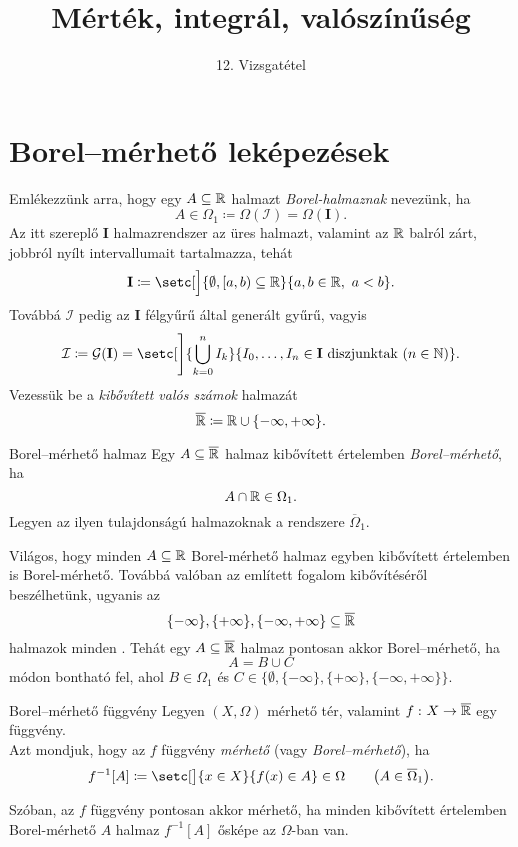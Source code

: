 \documentclass[
]{elteikthesis}[2024/04/26]
\title{Mérték, integrál, valószínűség} %
\subtitle{12. Vizsgatétel}
\begin{document}
	
	
	\section{Borel--mérhető leképezések}
	
	Emlékezzünk arra, hogy egy \( A \subseteq \mathbb{R} \) halmazt \emph{Borel-halmaznak} nevezünk, ha
	\[
		A \in \Omega_1 \coloneq \Omega( \mathcal{I} ) = \Omega( \mathbf{I} ).
	\]
	Az itt szereplő \( \mathbf{I} \) halmazrendszer az üres halmazt, 
	valamint az \( \mathbb{R} \) balról zárt, jobbról nyílt intervallumait tartalmazza, tehát
	\[
		\mathbf{I} \coloneq 
		\setc[\Big]{ \emptyset, [a, b) \subseteq \R }{ a, b \in \R, \ a < b }.
	\]
	Továbbá \( \mathcal{I} \) pedig az \( \mathbf{I} \) félgyűrű által generált gyűrű, vagyis
	\[
		\mathcal{I} \coloneq
		\mathcal{G}( \mathbf{I} ) = 
		\setc[\Bigg]{ \bigcup_{k=0}^{n} I_k }
		            { I_0, \dots, I_n \in \mathbf{I} \text{ diszjunktak } (n \in \N) }.
	\]
	Vezessük be a \emph{kibővített valós számok} halmazát
	\[
		\overline{ \mathbb{R} } \coloneq \mathbb{R} \cup \{ -\infty, +\infty \}.
	\]
	\begin{definition}{Borel--mérhető halmaz}{}
		Egy \( A \subseteq \overline{\mathbb{R}} \) halmaz 
		kibővített értelemben \emph{Borel--mérhető}, ha
		\[
			A \cap \mathbb{R} \in \Omega_1.
		\]
		Legyen az ilyen tulajdonságú halmazoknak a rendszere \( \overline{\Omega}_1 \).
	\end{definition}
	
	\begin{note}
		Világos, hogy minden \( A \subseteq \mathbb{R} \) Borel-mérhető halmaz egyben kibővített 
		értelemben is Borel-mérhető. Továbbá valóban az említett fogalom kibővítéséről beszélhetünk, ugyanis az
		\[
			\{ -\infty \}, \{ +\infty \}, \{ -\infty, +\infty \} \subseteq \overline{ \mathbb{R} }
		\]
		halmazok minden .
		Tehát egy \( A \subseteq \overline{ \mathbb{R} } \) halmaz pontosan akkor Borel--mérhető, ha
		\[
			A = B \cup C
		\]
		módon bontható fel, ahol \( B \in \Omega_1 \) és 
		\( C \in \bigl\{ \emptyset, \{ -\infty \}, \{ +\infty \}, \{ -\infty, +\infty \} \bigr\} \).
	\end{note}
	
	\begin{definition}{Borel--mérhető függvény}{}
%		
		Legyen \( (X, \Omega) \) mérhető tér, 
		valamint \( f \,\colon X \to \overline{\mathbb{R}} \) egy függvény.\\
		Azt mondjuk, hogy az \( f \) függvény \emph{mérhető} (vagy \emph{Borel--mérhető}), ha
		\[
			f^{-1}[A] \coloneq
			\setc[\big]{ x \in X }{ f(x) \in A } \in \Omega
			\qquad \bigl( A \in \overline{\Omega}_1 \bigr).
		\]
	\end{definition}
	\begin{note}
		Szóban, az \( f \) függvény pontosan akkor mérhető, 
		ha minden kibővített értelemben Borel-mérhető \( A \)
		halmaz \( f^{-1}[A] \) ősképe az \( \Omega \)-ban van.
	\end{note}
	
\end{document}
